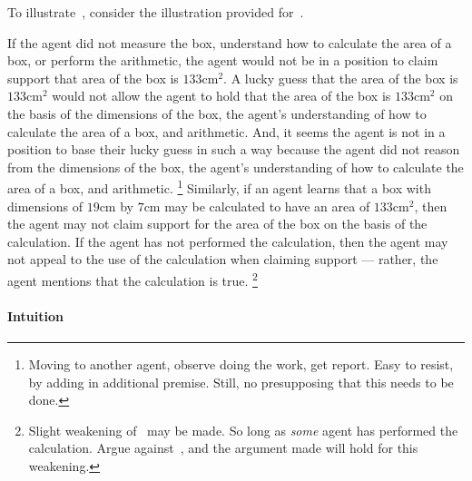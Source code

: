 \begin{note}[Illustration]
  To illustrate~\ESU{}, consider the illustration provided for~\USE{}.

    If the agent did not measure the box, understand how to calculate the area of a box, or perform the arithmetic, the agent would not be in a position to claim support that area of the box is \(133\text{cm}^{2}\).
  A lucky guess that the area of the box is \(133\text{cm}^{2}\) would not allow the agent to hold that the area of the box is  \(133\text{cm}^{2}\) on the basis of the dimensions of the box, the agent's understanding of how to calculate the area of a box, and arithmetic.
  And, it seems the agent is not in a position to base their lucky guess in such a way because the agent did not reason from the dimensions of the box, the agent's understanding of how to calculate the area of a box, and arithmetic.\nolinebreak
  \footnote{
    Moving to another agent, observe doing the work, get report.
    Easy to resist, by adding in additional premise.
    Still, no presupposing that this needs to be done.
  }
  Similarly, if an agent learns that a box with dimensions of \(19\text{cm}\) by \(7\text{cm}\) may be calculated to have an area of \(133\text{cm}^{2}\), then the agent may not claim support for the area of the box on the basis of the calculation.
  If the agent has not performed the calculation, then the agent may not appeal to the use of the calculation when claiming support --- rather, the agent mentions that the calculation is true.\nolinebreak
  \footnote{
    Slight weakening of~\ESU{} may be made.
    So long as \emph{some} agent has performed the calculation.
    Argue against~\ESU{}, and the argument made will hold for this weakening.
  }
\end{note}

\paragraph{Intuition}


